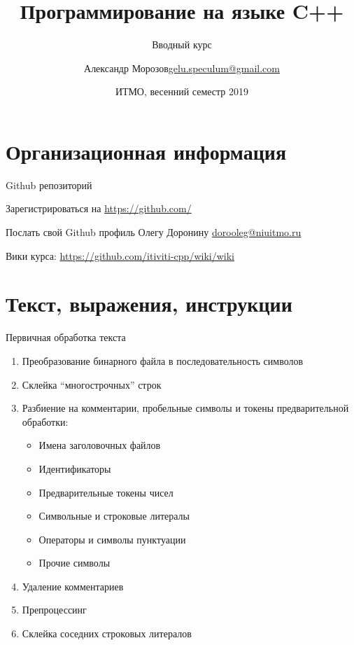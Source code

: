 \documentclass[unknownkeysallowed]{beamer}
\title[C++]
{Программирование на языке C++}
\subtitle{Вводный курс}
\author[А.~Б.~Морозов]
{
  \texorpdfstring{Александр Морозов\newline\href{mailto:gelu.speculum@gmail.com}{gelu.speculum@gmail.com}}
  {Александр Морозов}
}
\date[ITMO 2019]
{ИТМО, весенний семестр 2019}
\begin{document}
\frame{\titlepage}


\section{Организационная информация}

\begin{frame}{Github репозиторий}

Зарегистрироваться на \href{https://github.com/}{https://github.com/} \vspace{3em}

Послать свой Github профиль Олегу Доронину \href{mailto:dorooleg@niuitmo.ru}{dorooleg@niuitmo.ru} \vspace{3em}

Вики курса: \href{https://github.com/itiviti-cpp/wiki/wiki}{https://github.com/itiviti-cpp/wiki/wiki}

\end{frame}


\section{Текст, выражения, инструкции}

\begin{frame}{Первичная обработка текста}

  \begin{enumerate}
    \item Преобразование бинарного файла в последовательность символов
    \item Склейка ``многострочных'' строк
    \item Разбиение на комментарии, пробельные символы и токены предварительной обработки:
      \begin{itemize}
        \item Имена заголовочных файлов
        \item Идентификаторы
        \item Предварительные токены чисел
        \item Символьные и строковые литералы
        \item Операторы и символы пунктуации
        \item Прочие символы
      \end{itemize}
    \item Удаление комментариев
    \item Препроцессинг
    \item Склейка соседних строковых литералов
  \end{enumerate}
  
\end{frame}
\end{document}
